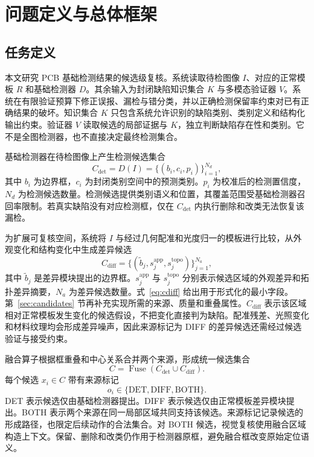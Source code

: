 \section{问题定义与总体框架}
\label{sec:problem}

\subsection{任务定义}

本文研究 PCB 基础检测结果的候选级复核。系统读取待检图像 $I$、对应的正常模板 $R$ 和基础检测器 $D$。其余输入为封闭缺陷知识集合 $K$ 与多模态验证器 $V$。系统在有限验证预算下修正误报、漏检与错分类，并以正确检测保留率约束对已有正确结果的破坏。知识集合 $K$ 只包含系统允许识别的缺陷类别、类别定义和结构化输出约束。验证器 $V$ 读取候选的局部证据与 $K$，独立判断缺陷存在性和类别。它不是全图检测器，也不直接决定最终检测集合。

基础检测器在待检图像上产生检测候选集合
\begin{equation}
  C_{\mathrm{det}}=D(I)=\{(b_i,c_i,p_i)\}_{i=1}^{N_d},
  \label{eq:cdet}
\end{equation}
其中 $b_i$ 为边界框，$c_i$ 为封闭类别空间中的预测类别。$p_i$ 为校准后的检测置信度，$N_d$ 为检测候选数量。检测候选提供类别语义和位置，其覆盖范围受基础检测器召回率限制。若真实缺陷没有对应检测框，仅在 $C_{\mathrm{det}}$ 内执行删除和改类无法恢复该漏检。

为扩展可复核空间，系统将 $I$ 与经过几何配准和光度归一的模板进行比较，从外观变化和结构变化中生成差异候选
\begin{equation}
  C_{\mathrm{diff}}=
  \{(\tilde b_j,s^{\mathrm{app}}_j,s^{\mathrm{topo}}_j)\}_{j=1}^{N_a},
  \label{eq:cdiff}
\end{equation}
其中 $\tilde b_j$ 是差异模块提出的边界框。$s^{\mathrm{app}}_j$ 与 $s^{\mathrm{topo}}_j$ 分别表示候选区域的外观差异和拓扑差异摘要，$N_a$ 为差异候选数量。式~\eqref{eq:cdiff} 给出用于形式化的最小字段。第~\ref{sec:candidates} 节再补充实现所需的来源、质量和重叠属性。$C_{\mathrm{diff}}$ 表示该区域相对正常模板发生变化的候选假设，不把变化直接判为缺陷。配准残差、光照变化和材料纹理均会形成差异噪声，因此来源标记为 DIFF 的差异候选还需经过候选验证与接受约束。

融合算子根据框重叠和中心关系合并两个来源，形成统一候选集合
\begin{equation}
  C=\operatorname{Fuse}(C_{\mathrm{det}}\cup C_{\mathrm{diff}}).
  \label{eq:fuse}
\end{equation}
每个候选 $x_i\in C$ 带有来源标记
\begin{equation}
  o_i\in\{\mathrm{DET},\mathrm{DIFF},\mathrm{BOTH}\}.
  \label{eq:origin}
\end{equation}
DET 表示候选仅由基础检测器提出。DIFF 表示候选仅由正常模板差异模块提出。BOTH 表示两个来源在同一局部区域共同支持该候选。来源标记记录候选的形成路径，也限定后续动作的合法集合。对 BOTH 候选，视觉复核使用融合区域构造上下文。保留、删除和改类仍作用于检测器原框，避免融合框改变原始定位语义。

